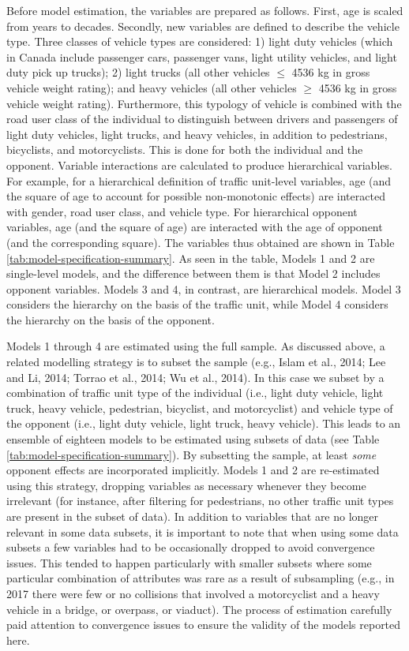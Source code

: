 \documentclass[]{elsarticle} %
\begin{document}
Before model estimation, the variables are prepared as follows. First,
age is scaled from years to decades. Secondly, new variables are defined
to describe the vehicle type. Three classes of vehicle types are
considered: 1) light duty vehicles (which in Canada include passenger
cars, passenger vans, light utility vehicles, and light duty pick up
trucks); 2) light trucks (all other vehicles \(\le\) 4536 kg in gross
vehicle weight rating); and heavy vehicles (all other vehicles \(\ge\)
4536 kg in gross vehicle weight rating). Furthermore, this typology of
vehicle is combined with the road user class of the individual to
distinguish between drivers and passengers of light duty vehicles, light
trucks, and heavy vehicles, in addition to pedestrians, bicyclists, and
motorcyclists. This is done for both the individual and the opponent.
Variable interactions are calculated to produce hierarchical variables.
For example, for a hierarchical definition of traffic unit-level
variables, age (and the square of age to account for possible
non-monotonic effects) are interacted with gender, road user class, and
vehicle type. For hierarchical opponent variables, age (and the square
of age) are interacted with the age of opponent (and the corresponding
square). The variables thus obtained are shown in Table
\ref{tab:model-specification-summary}. As seen in the table, Models 1
and 2 are single-level models, and the difference between them is that
Model 2 includes opponent variables. Models 3 and 4, in contrast, are
hierarchical models. Model 3 considers the hierarchy on the basis of the
traffic unit, while Model 4 considers the hierarchy on the basis of the
opponent.

Models 1 through 4 are estimated using the full sample. As discussed
above, a related modelling strategy is to subset the sample (e.g., Islam
et al., 2014; Lee and Li, 2014; Torrao et al., 2014; Wu et al., 2014).
In this case we subset by a combination of traffic unit type of the
individual (i.e., light duty vehicle, light truck, heavy vehicle,
pedestrian, bicyclist, and motorcyclist) and vehicle type of the
opponent (i.e., light duty vehicle, light truck, heavy vehicle). This
leads to an ensemble of eighteen models to be estimated using subsets of
data (see Table \ref{tab:model-specification-summary}). By subsetting
the sample, at least \emph{some} opponent effects are incorporated
implicitly. Models 1 and 2 are re-estimated using this strategy,
dropping variables as necessary whenever they become irrelevant (for
instance, after filtering for pedestrians, no other traffic unit types
are present in the subset of data). In addition to variables that are no
longer relevant in some data subsets, it is important to note that when
using some data subsets a few variables had to be occasionally dropped
to avoid convergence issues. This tended to happen particularly with
smaller subsets where some particular combination of attributes was rare
as a result of subsampling (e.g., in 2017 there were few or no
collisions that involved a motorcyclist and a heavy vehicle in a bridge,
or overpass, or viaduct). The process of estimation carefully paid
attention to convergence issues to ensure the validity of the models
reported here.
\end{document}
